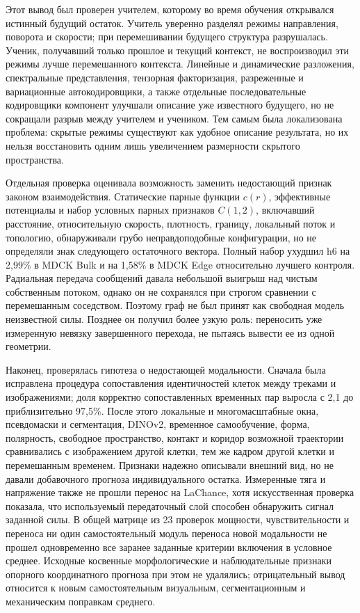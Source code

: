\documentclass[11pt,a4paper]{article}
\begin{document}
Этот вывод был проверен учителем, которому во время обучения открывался истинный будущий остаток. Учитель уверенно разделял режимы направления, поворота и скорости; при перемешивании будущего структура разрушалась. Ученик, получавший только прошлое и текущий контекст, не воспроизводил эти режимы лучше перемешанного контекста. Линейные и динамические разложения, спектральные представления, тензорная факторизация, разреженные и вариационные автокодировщики, а также отдельные последовательные кодировщики компонент улучшали описание уже известного будущего, но не сокращали разрыв между учителем и учеником. Тем самым была локализована проблема: скрытые режимы существуют как удобное описание результата, но их нельзя восстановить одним лишь увеличением размерности скрытого пространства.

Отдельная проверка оценивала возможность заменить недостающий признак законом взаимодействия. Статические парные функции $c(r)$, эффективные потенциалы и набор условных парных признаков $C(1,2)$, включавший расстояние, относительную скорость, плотность, границу, локальный поток и топологию, обнаруживали грубо неправдоподобные конфигурации, но не определяли знак следующего остаточного вектора. Полный набор ухудшил h6 на 2,99\% в MDCK Bulk и на 1,58\% в MDCK Edge относительно лучшего контроля. Радиальная передача сообщений давала небольшой выигрыш над чистым собственным потоком, однако он не сохранялся при строгом сравнении с перемешанным соседством. Поэтому граф не был принят как свободная модель неизвестной силы. Позднее он получил более узкую роль: переносить уже измеренную невязку завершенного перехода, не пытаясь вывести ее из одной геометрии.

Наконец, проверялась гипотеза о недостающей модальности. Сначала была исправлена процедура сопоставления идентичностей клеток между треками и изображениями; доля корректно сопоставленных временных пар выросла с 2,1 до приблизительно 97,5\%. После этого локальные и многомасштабные окна, псевдомаски и сегментация, DINOv2, временное самообучение, форма, полярность, свободное пространство, контакт и коридор возможной траектории сравнивались с изображением другой клетки, тем же кадром другой клетки и перемешанным временем. Признаки надежно описывали внешний вид, но не давали добавочного прогноза индивидуального остатка. Измеренные тяга и напряжение также не прошли перенос на LaChance, хотя искусственная проверка показала, что используемый передаточный слой способен обнаружить сигнал заданной силы. В общей матрице из 23 проверок мощности, чувствительности и переноса ни один самостоятельный модуль переноса новой модальности не прошел одновременно все заранее заданные критерии включения в условное среднее. Исходные косвенные морфологические и наблюдательные признаки опорного координатного прогноза при этом не удалялись; отрицательный вывод относится к новым самостоятельным визуальным, сегментационным и механическим поправкам среднего.
\end{document}
